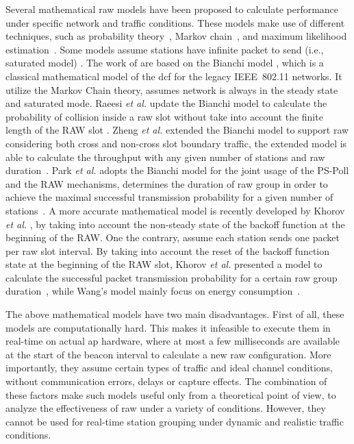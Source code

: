 Several mathematical \gls{raw} models have been proposed to calculate  performance under specific network and traffic conditions. These models make use of different techniques, such as probability theory~\cite{Wang2015}, Markov chain~\cite{Raeesi2014a, Khorov2015b,Zheng2014, Evgeny2018, Khorov2015b, Park2014b}, and maximum likelihood estimation~\cite{Park2014b}. Some models  assume stations have infinite packet to send (i.e., saturated model)  \cite{Raeesi2014a, Zheng2014, Park2014b, Evgeny2018}. The work of \cite{Raeesi2014a, Zheng2014, Park2014b} are based on the Bianchi model \cite{bianchi2000performance}, which is a classical mathematical model of the \gls{dcf} for the legacy IEEE~802.11 networks. It utilize the Markov Chain theory, assumes network is always in the steady state and saturated mode. Raeesi \textit{et al.}  update the Bianchi model to calculate the probability of collision inside a \gls{raw} slot without take into account the finite length of the RAW slot \cite{Raeesi2014a}. Zheng \textit{et al.} extended the Bianchi model to support \gls{raw} considering both cross and non-cross slot boundary traffic, the extended model is able to calculate the throughput with any given number of stations and \gls{raw} duration~\cite{Zheng2014}. Park \textit{et al.} adopts the Bianchi model for the  joint usage of the PS-Poll and the RAW mechanisms, determines the duration of \gls{raw} group in order to achieve the maximal successful transmission probability for a given number of stations~\cite{Park2014b}. A more accurate mathematical model is recently developed by Khorov \textit{et al.} \cite{Evgeny2018}, by taking into account the non-steady state of the backoff function at the beginning of the RAW. One the contrary, \cite{Khorov2015b, Wang2015} assume each station sends one packet per \gls{raw} slot interval. By taking into account the reset of the backoff function state at the beginning of the RAW slot, Khorov \textit{et al.} presented a model to calculate the successful packet transmission probability for a certain \gls{raw} group duration~\cite{Khorov2015b}, while Wang's model mainly focus on energy consumption~\cite{Wang2015}. 

The above mathematical models have two main disadvantages. First of all, these models are computationally hard. This makes it infeasible to execute them in real-time on actual \gls{ap} hardware, where at most a few milliseconds are available at the start of the beacon interval to calculate a new \gls{raw} configuration. More importantly, they assume certain types of traffic and ideal channel conditions, without communication errors, delays or capture effects. The combination of these factors make such models useful only from a theoretical point of view, to analyze the effectiveness of \gls{raw} under a variety of conditions. However, they cannot be used for real-time station grouping under dynamic and realistic traffic conditions. 

